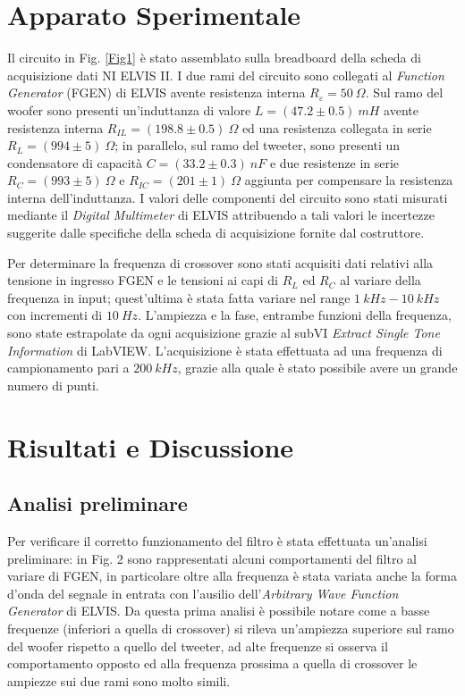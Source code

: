 \documentclass[12pt]{article}
\begin{document}
\section{Apparato Sperimentale}
Il circuito in Fig. \ref{Fig1} è stato assemblato sulla breadboard della scheda di acquisizione dati NI ELVIS II. I due rami del circuito sono collegati
al \textit{Function Generator} (FGEN) di ELVIS avente resistenza interna $R_\varepsilon = 50 \ \Omega$. Sul ramo del woofer sono presenti un'induttanza di 
valore $L=(47.2 \pm 0.5) \ mH$ avente resistenza interna $R_{IL}=(198.8\pm0.5) \ \Omega$ ed una resistenza collegata in serie $R_L=(994\pm5) \ \Omega$;
in parallelo, sul ramo del tweeter, sono presenti un condensatore di capacità $C=(33.2\pm0.3) \ nF$ e due resistenze in serie $R_C=(993\pm5) \ \Omega$ e
$R_{IC}=(201\pm1) \ \Omega$ aggiunta per compensare la resistenza interna dell'induttanza. I valori delle componenti del circuito sono stati misurati 
mediante il \textit{Digital Multimeter} di ELVIS attribuendo a tali valori le incertezze suggerite dalle specifiche della scheda di acquisizione fornite 
dal costruttore. 

Per determinare la frequenza di crossover sono stati acquisiti dati relativi alla tensione in ingresso FGEN e le tensioni ai capi di $R_L$ ed $R_C$ al 
variare della frequenza in input; quest'ultima è stata fatta variare nel range $1 \ kHz - 10 \ kHz$ con incrementi di $10 \ Hz$. L'ampiezza e la fase, 
entrambe funzioni della frequenza, sono state estrapolate da ogni acquisizione grazie al subVI \textit{Extract Single Tone Information} di LabVIEW. 
L'acquisizione è stata effettuata ad una frequenza di campionamento pari a $200 \ kHz$, grazie alla quale è stato possibile avere un grande numero di punti.

\section{Risultati e Discussione}
\subsection{Analisi preliminare}
Per verificare il corretto funzionamento del filtro è stata effettuata un'analisi preliminare: in Fig. 2 sono rappresentati alcuni comportamenti del filtro al variare di FGEN, in particolare
oltre alla frequenza è stata variata anche la forma d'onda del segnale in entrata con l'ausilio dell'\textit{Arbitrary Wave Function Generator} di ELVIS. Da questa prima analisi 
è possibile notare come a basse frequenze (inferiori a quella di crossover) si rileva un'ampiezza
superiore sul ramo del woofer rispetto a quello del tweeter, ad alte frequenze si osserva il 
comportamento opposto ed alla frequenza prossima a quella di crossover le ampiezze sui due rami sono molto simili.
\end{document}
